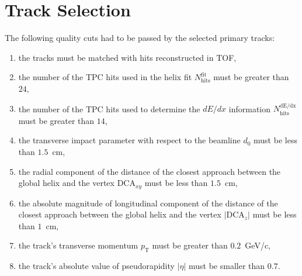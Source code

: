 \section{Track Selection}\label{section:star_track_selection}
The following quality cuts had to be passed by the selected primary tracks:


\begin{enumerate}
	\item the tracks must be matched with hits reconstructed in TOF,
	\item the number of the  TPC hits used in the helix fit $N_{\textrm{hits}}^{\textrm{fit}}$ must be greater than $24$,
	\item the number of the  TPC hits used to determine the $dE/dx$ information $N_{\textrm{hits}}^{\textrm{dE/dx}}$ must be greater than $14$,
	\item the transverse impact parameter with respect to the beamline $d_0$ must be less than $1.5$~cm,
	\item the radial component of the distance of the closest approach between  the global helix and the vertex $\textrm{DCA}_{xy}$ must be less than $1.5$~cm,
	\item the absolute magnitude of  longitudinal component of the distance of the closest approach between  the global helix and the vertex $|\textrm{DCA}_{z}|$ must be less than $1$~cm,
	\item the track's transverse momentum $p_\textrm{T}$ must be greater than $0.2$~GeV/c,
	\item the track's absolute value of  pseudorapidity $|\eta|$ must be smaller than $0.7$.
\end{enumerate}

